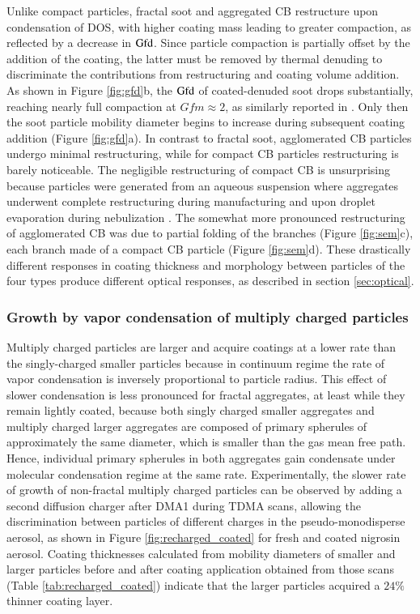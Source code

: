 \documentclass[12pt,authoryear]{elsarticle}
\begin{document}
Unlike compact particles, fractal soot and aggregated CB restructure upon condensation of DOS, with higher coating mass leading to greater compaction, as reflected by a decrease in $\rm Gfd$. Since particle compaction is partially offset by the addition of the coating, the latter must be removed by thermal denuding to discriminate the contributions from restructuring and coating volume addition. As shown in Figure \ref{fig:gfd}b, the $\rm Gfd$ of coated-denuded soot drops substantially, reaching nearly full compaction at $Gfm \approx 2$, as similarly reported in \citep{RN13}. Only then the soot particle mobility diameter begins to increase during subsequent coating addition (Figure \ref{fig:gfd}a). In contrast to fractal soot, agglomerated CB particles undergo minimal restructuring, while for compact CB particles restructuring is barely noticeable. The negligible restructuring of compact CB is unsurprising because particles were generated from an aqueous suspension where aggregates underwent complete restructuring during manufacturing and upon droplet evaporation during nebulization \citep{RN51}. The somewhat more pronounced restructuring of agglomerated CB was due to partial folding of the branches (Figure \ref{fig:sem}c), each branch made of a compact CB particle (Figure \ref{fig:sem}d). These drastically different responses in coating thickness and morphology between particles of the four types produce different optical responses, as described in section \ref{sec:optical}.

\subsubsection{Growth by vapor condensation of multiply charged particles}

Multiply charged particles are larger and acquire coatings at a lower rate than the singly-charged smaller particles because in continuum regime the rate of vapor condensation is inversely proportional to particle radius. This effect of slower condensation is less pronounced for fractal aggregates, at least while they remain lightly coated, because both singly charged smaller aggregates and multiply charged larger aggregates are composed of primary spherules of approximately the same diameter, which is smaller than the gas mean free path. Hence, individual primary spherules in both aggregates gain condensate under molecular condensation regime at the same rate. Experimentally, the slower rate of growth of non-fractal multiply charged particles can be observed by adding a second diffusion charger after DMA1 during TDMA scans, allowing the discrimination between particles of different charges in the pseudo-monodisperse aerosol, as shown in Figure \ref{fig:recharged_coated} for fresh and coated nigrosin aerosol. Coating thicknesses calculated from mobility diameters of smaller and larger particles before and after coating application obtained from those scans (Table \ref{tab:recharged_coated}) indicate that the larger particles acquired a $24\%$ thinner coating layer.
\end{document}
